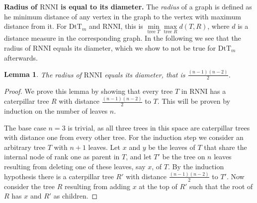 \documentclass[11pt]{amsart}
\newtheorem{lemma}{Lemma}
\newcommand{\rnni}{\mathrm{RNNI}}
\newcommand{\dtt}{\mathrm{DtT}}
\newcommand{\summary}[1]{\textbf{#1}} %
\begin{document}
\summary{Radius of $\rnni$ is equal to its diameter.}
The \emph{radius} of a graph is defined as he minimum distance of any vertex in the graph to the vertex with maximum distance from it.
For $\dtt_m$ and $\rnni$, this is $\min\limits_{\text{tree } T}\max\limits_{\text{tree }R} d(T,R)$, where $d$ is a distance measure in the corresponding graph.
In the following we see that the radius of $\rnni$ equals its diameter, which we show to not be true for $\dtt_m$ afterwards.

\begin{lemma}
	The radius of $\rnni$ equals its diameter, that is $\frac{(n-1)(n-2)}{2}$.
	\label{lemma:radius_rnni}
\end{lemma}

\begin{proof}
	We prove this lemma by showing that every tree $T$ in $\rnni$ has a caterpillar tree $R$ with distance $\frac{(n-1)(n-2)}{2}$ to $T$.
	This will be proven by induction on the number of leaves $n$.

	The base case $n=3$ is trivial, as all three trees in this space are caterpillar trees with distance one from every other tree.
	For the induction step we consider an arbitrary tree $T$ with $n+1$ leaves.
	Let $x$ and $y$ be the leaves of $T$ that share the internal node of rank one as parent in $T$, and let $T'$ be the tree on $n$ leaves resulting from deleting one of these leaves, say $x$, of $T$.
	By the induction hypothesis there is a caterpillar tree $R'$ with distance $\frac{(n-1)(n-2)}{2}$ to $T'$.
	Now consider the tree $R$ resulting from adding $x$ at the top of $R'$ such that the root of $R$ has $x$ and $R'$ as children.


\end{proof}
\end{document}
